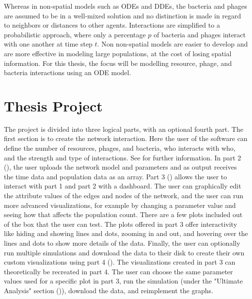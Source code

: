 Whereas in non-spatial models such as ODEs and DDEs, the bacteria and phages are assumed to be in a well-mixed solution and no distinction is made in regard to neighbors or distances to other agents. 
Interactions are simplified to a probabilistic approach, where only a percentage $p$ of bacteria and phages interact with one another at time step $t$.
Non non-spatial models are easier to develop and are more effective in modeling large populations, at the cost of losing spatial information. \newline
For this thesis, the focus will be modelling resource, phage, and bacteria interactions using an ODE model. 

\section{Thesis Project}
The project is divided into three logical parts, with an optional fourth part.
The first section is to create the network interaction. 
Here the user of the software can define the number of resources, phages, and bacteria, who interacts with who, and the strength and type of interactions. See  for further information. \newline
In part 2 (), the user uploads the network model and parameters and as output receives the time data and population data as an array. \newline
Part 3 () allows the user to interact with part 1 and part 2 with a dashboard. 
The user can graphically edit the attribute values of the edges and nodes of the network, and the user can run more advanced visualizations, for example by changing a parameter value and seeing how that affects the population count. 
There are a few plots included out of the box that the user can test. 
The plots offered in part 3 offer interactivity like hiding and showing lines and dots, zooming in and out, and hovering over the lines and dots to show more details of the data. 
\newline
Finally, the user can optionally run multiple simulations and download the data to their disk to create their own custom visualizations using part 4 (). 
The visualizations created in part 3 can theoretically be recreated in part 4. 
The user can choose the same parameter values used for a specific plot in part 3, run the simulation (under the "Ultimate Analysis" section ()), download the data, and reimplement the graphs. 